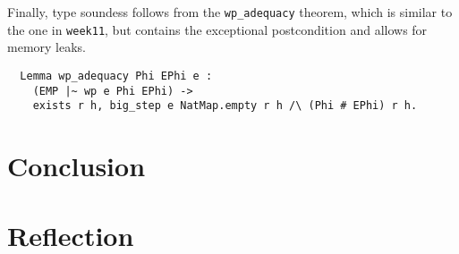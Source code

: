 \documentclass{article}
\begin{document}
Finally, type soundess follows from the \texttt{wp\_adequacy} theorem, which is similar to the one in \texttt{week11}, but contains the exceptional postcondition and allows for memory leaks.
\begin{lstlisting}
  Lemma wp_adequacy Phi EPhi e :
    (EMP |~ wp e Phi EPhi) ->
    exists r h, big_step e NatMap.empty r h /\ (Phi # EPhi) r h.
\end{lstlisting}

\section{Conclusion}

\section{Reflection}
\end{document}
